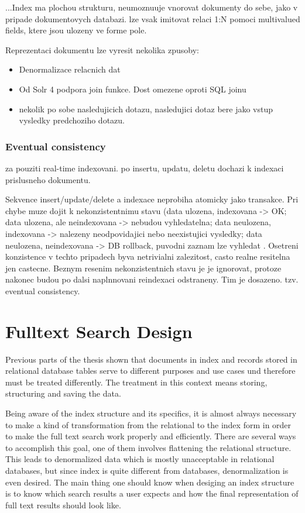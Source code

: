 \documentclass[12pt, oneside, a4paper]{book}
\begin{document}
...Index ma plochou strukturu, neumoznuuje vnorovat dokumenty
do sebe, jako v pripade dokumentovych databazi. lze vsak imitovat
relaci 1:N pomoci multivalued fields, ktere jsou ulozeny ve forme
pole.

Reprezentaci dokumentu lze vyresit nekolika zpusoby:
\begin{itemize}
\item Denormalizace relacnich dat
\item Od Solr 4 podpora join funkce. Dost omezene oproti SQL joinu
\item nekolik po sobe nasledujicich dotazu, nasledujici dotaz
bere jako vstup vysledky predchoziho dotazu.
\end{itemize}

\subsection{Eventual consistency}

za pouziti real-time indexovani. po insertu, updatu, deletu dochazi
k indexaci prislusneho dokumentu.

Sekvence insert/update/delete a indexace neprobiha atomicky jako transakce.
Pri chybe muze dojit k nekonzistentnimu stavu (data ulozena,
indexovana -> OK; data ulozena, ale neindexovana -> nebudou vyhledatelna;
data neulozena, indexovana -> nalezeny neodpovidajici nebo neexistujici
vysledky; data neulozena, neindexovana -> DB rollback, puvodni
zaznam lze vyhledat . Osetreni konzistence v techto pripadech
byva netrivialni zalezitost, casto realne resitelna jen
castecne. Beznym resenim nekonzistentnich stavu
je je ignorovat, protoze nakonec budou po dalsi naplnnovani reindexaci
odstraneny. Tim je dosazeno. tzv. eventual consistency.


\chapter{Fulltext Search Design}

Previous parts of the thesis shown that documents in index and records
stored in relational database tables serve to different purposes and
use cases und therefore must be treated differently. The treatment
in this context means storing, structuring and saving the data.

Being aware of the index structure and its specifics, it is almost
always necessary to make a kind of transformation from the relational
to the index form in order to make the full text search work properly
and efficiently. There are several ways to accomplish this goal, one
of them involves flattening the relational structure. This leads to
denormalized data which is mostly unacceptable in relational databases,
but since index is quite different from databases, denormalization
is even desired. The main thing one should know when desiging an index
structure is to know which search results a user expects and how the
final representation of full text results should look like.
\end{document}
